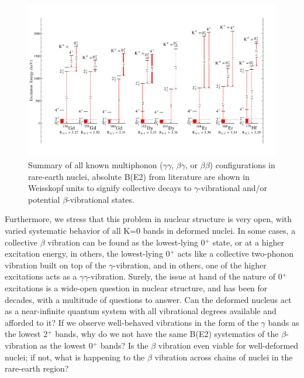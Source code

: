 \begin{landscape}
\begin{figure}[ht] 
\begin{center}
\includegraphics[height=0.8\textheight]{figures/Multiphonon_RareEarths.pdf}
\caption{Summary of all known multiphonon ($\gamma\gamma$, $\beta\gamma$, or $\beta\beta$) configurations in rare-earth nuclei, absolute B(E2) from literature are shown in Weisskopf units to signify collective decays to $\gamma$-vibrational and/or potential $\beta$-vibrational states.
\label{fig:RareEarth_Multiphonon}}
\end{center}
\end{figure}
\end{landscape}

Furthermore, we stress that this problem in nuclear structure is very open, with varied systematic behavior of all K=0 bands in deformed nuclei. In some cases, a collective $\beta$ vibration can be found as the lowest-lying 0$^+$ state, or at a higher excitation energy, in others, the lowest-lying 0$^+$ acts like a collective two-phonon vibration built on top of the $\gamma$-vibration, and in others, one of the higher excitations acts as a $\gamma\gamma$-vibration. Surely, the issue at hand of the nature of 0$^+$ excitations is a wide-open question in nuclear structure, and has been for decades, with a multitude of questions to answer. Can the deformed nucleus act as a near-infinite quantum system with all vibrational degrees available and afforded to it? If we observe well-behaved vibrations in the form of the $\gamma$ bands as the lowest 2$^+$ bands, why do we not have the same B(E2) systematics of the $\beta$-vibration as the lowest 0$^+$ bands? Is the $\beta$ vibration even viable for well-deformed nuclei; if not, what is happening to the $\beta$ vibration across chains of nuclei in the rare-earth region? 


